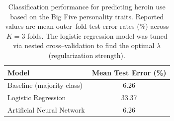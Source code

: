 
\begin{table}[H]
    \centering
    \caption{Classification performance for predicting heroin use based on the Big Five personality traits.
    Reported values are mean outer–fold test error rates (\%) across $K = 3$ folds.
    The logistic regression model was tuned via nested cross–validation to find the optimal $\lambda$ (regularization strength).}
    \label{tab:classification:heroin}
    \begin{tabular}{l c}
        \toprule
        \textbf{Model} & \textbf{Mean Test Error (\%)} \\
        \midrule
        Baseline (majority class) & 6.26 \\
        Logistic Regression & 33.37 \\
        Artificial Neural Network & 6.26 \\
        \bottomrule
    \end{tabular}
\end{table}
